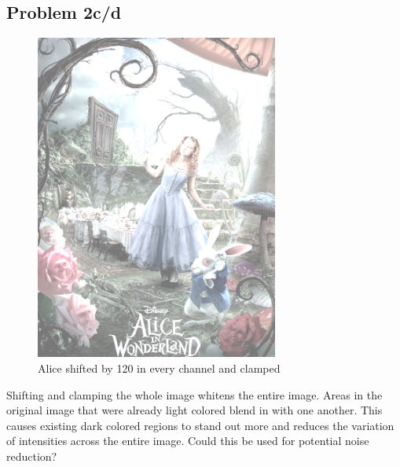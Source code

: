\documentclass{math}
\begin{document}
\subsection*{Problem 2c/d}
\begin{figure}[H]
  \centering
  \includegraphics[width=8cm]{assets/hw_01_alice_shifted.png}
  \caption{Alice shifted by 120 in every channel and clamped}
\end{figure}
Shifting and clamping the whole image whitens the entire image. Areas in the
original image that were already light colored blend in with one another. This
causes existing dark colored regions to stand out more and reduces the variation
of intensities across the entire image. Could this be used for potential noise
reduction?
\end{document}
